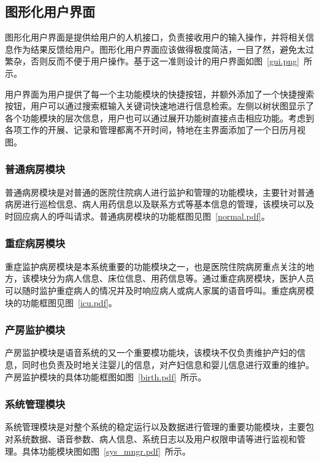 \subsection{图形化用户界面}
图形化用户界面是提供给用户的人机接口，负责接收用户的输入操作，并将相关信息作为结果反馈给用户。图形化用户界面应该做得极度简洁，一目了然，避免太过繁杂，否则反而不便于用户操作。基于这一准则设计的用户界面如图~\ref{gui.png}~所示。

用户界面为用户提供了每一个主功能模块的快捷按钮，并额外添加了一个快捷搜索按钮，用户可以通过搜索框输入关键词快速地进行信息检索。左侧以树状图显示了各个功能模块的层次信息，用户也可以通过展开功能树直接点击相应功能。考虑到各项工作的开展、记录和管理都离不开时间，特地在主界面添加了一个日历月视图。

\subsubsection{普通病房模块}
普通病房模块是对普通的医院住院病人进行监护和管理的功能模块，主要针对普通病房进行巡检信息、病人用药信息以及联系方式等基本信息的管理，该模块可以及时回应病人的呼叫请求。普通病房模块的功能框图见图~\ref{normal.pdf}。

\subsubsection{重症病房模块}
重症监护病房模块是本系统重要的功能模块之一，也是医院住院病房重点关注的地方，该模块分为病人信息、床位信息、用药信息等。通过重症病房模块，医护人员可以随时监护重症病人的情况并及时响应病人或病人家属的语音呼叫。重症病房模块的功能框图见图~\ref{icu.pdf}。

\subsubsection{产房监护模块}
产房监护模块是语音系统的又一个重要模功能块，该模块不仅负责维护产妇的信息，同时也负责及时地关注婴儿的信息，对产妇信息和婴儿信息进行双重的维护。产房监护模块的具体功能框图如图~\ref{birth.pdf}~所示。

\subsubsection{系统管理模块}
系统管理模块是对整个系统的稳定运行以及数据进行管理的重要功能模块，主要包对系统数据、语音参数、病人信息、系统日志以及用户权限申请等进行监视和管理。具体功能模块图如图~\ref{sys_mngr.pdf}~所示。
	
